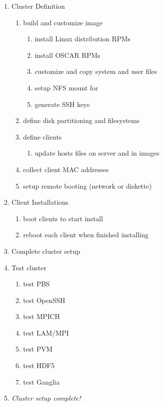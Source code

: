\begin{enumerate}
\item Cluster Definition
  \begin{enumerate}
  \item build and customize image
    \begin{enumerate}
    \item install Linux distribution RPMs
    \item install OSCAR RPMs
    \item customize and copy system and user files
    \item setup NFS mount for 
    \item generate SSH keys
    \end{enumerate}
  \item define disk partitioning and filesystems
  \item define clients
    \begin{enumerate}
    \item update hosts files on server and in images
    \end{enumerate}
  \item collect client MAC addresses
  \item setup remote booting (network or diskette)
  \end{enumerate}
  
\item Client Installations
  \begin{enumerate}
  \item boot clients to start install
  \item reboot each client when finished installing
  \end{enumerate}
\item Complete cluster setup
\item Test cluster
  \begin{enumerate}
  \item test PBS
  \item test OpenSSH
  \item test MPICH
  \item test LAM/MPI
  \item test PVM
  \item test HDF5
  \item test Ganglia
  \end{enumerate}
\item \emph{Cluster setup complete!}
\end{enumerate}

